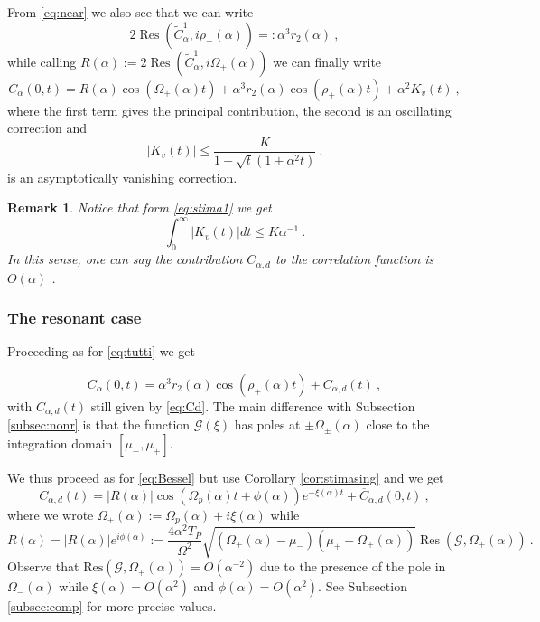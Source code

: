 \documentclass[11pt]{article}
\numberwithin{equation}{section}
\DeclareMathOperator{\Res}{Res}
\newtheorem{rmk}[theorem]{Remark}
\numberwithin{theorem}{section}
\def\tilde#1{\widetilde{#1}}
\begin{document}
From \eqref{eq:near} we also see that we can write
\[
 2\Res(\tilde C^1_\alpha,i\rho_+(\alpha))=:\alpha^3 r_2(\alpha)\ ,
\]
while calling $R(\alpha):=2\Res(\tilde C^1_\alpha,i\Omega_+(\alpha))$ we can finally write
\begin{equation}\label{eq:final_out}
 C_\alpha(0,t)=R(\alpha)\cos(\Omega_+(\alpha)t)+ \alpha^3 r_2(\alpha)
 \cos(\rho_+(\alpha)t)+ \alpha^2 K_{v}(t)\ ,
\end{equation}
where the first term gives the principal contribution, the second is an oscillating correction and
\begin{equation}\label{eq:stima1}
 |K_{v}(t)|\leq \frac{K}{1+\sqrt t(1+\alpha^2 t)}\ .
\end{equation}
is an asymptotically vanishing correction.

\begin{rmk}\label{rmk:int}\emph{Notice that form \eqref{eq:stima1} we get
\[
 \int_0^\infty |K_{v}(t)|dt\leq K\alpha^{-1}\ .
\]
In this sense, one can say the contribution $C_{\alpha,d}$ to the
correlation function is $O(\alpha)$} .
\end{rmk}



\subsubsection{The resonant case}\label{subsec:r}

Proceeding as for \eqref{eq:tutti} we get

\begin{equation}\label{eq:tutti_bis}
 C_\alpha(0,t)=
\alpha^3 r_2(\alpha) \cos(\rho_+(\alpha)t)+C_{\alpha,d}(t)\ ,
\end{equation}
%
with $C_{\alpha,d}(t)$ still given by \eqref{eq:Cd}. The main difference with Subsection \ref{subsec:nonr} is that the
function $\mathcal G(\xi)$ has poles at $\pm\Omega_\pm(\alpha)$ close to the integration domain $[\mu_-,\mu_+]$.

We thus proceed as for \eqref{eq:Bessel} but use Corollary \ref{cor:stimasing} and we get
\[
C_{\alpha,d}(t)=
|R(\alpha)|\cos(\Omega_p(\alpha)t+\phi(\alpha))e^{-\xi(\alpha)t}+\overline
C_{\alpha,d}(0,t)\ ,
\]
where we wrote $\Omega_+(\alpha):=\Omega_p(\alpha)+i\xi(\alpha)$ while
\[
 R(\alpha)=|R(\alpha)|e^{i\phi(\alpha)}:=\frac{4\alpha^2 T_P}{\Omega^2}
\sqrt{(\Omega_+(\alpha)-\mu_-)(\mu_+-\Omega_+(\alpha))}\Res(\mathcal
G,\Omega_+(\alpha))\ .
\]
Observe that $\mathrm{Res}(\mathcal G,\Omega_+(\alpha))=O(\alpha^{-2})$ due to the presence of the pole in
$\Omega_-(\alpha)$ while $\xi(\alpha)=O(\alpha^2)$ and $\phi(\alpha)=O(\alpha^2)$. See Subsection \ref{subsec:comp} for
more precise values.
\end{document}
